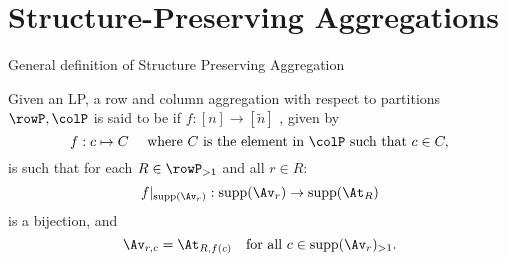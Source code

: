    
\section{Structure-Preserving Aggregations}

\begin{frame}{General definition of Structure Preserving Aggregation}

\begin{definition}
    \label{def:structure preserving aggregation}
    Given an LP, a row and column aggregation with respect to partitions \(\rowP,  \colP\) is said to be  if \(f:[n] \rightarrow [\tilde{n}]\)
    \pause, given by
    \[
    f : c \mapsto C \quad \text{ where } C \text{ is the element in } \colP \text{ such that } c\in C,
    \]
    \pause is such that for each \(R \in \rowP_{>1}\) and all \(r \in R\):
    \[
    f|_{\supp(\Av_r)} : \supp(\Av_r) \rightarrow \supp(\At_R)
    \]
    is a bijection, and \pause
    \[
    \Av_{r,c} = \At_{R,f(c)} \quad \text{for all } c \in \supp(\Av_r)_{>1}.
    \]
  \end{definition}
\end{frame}

